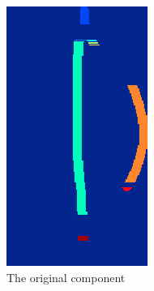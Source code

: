 \begin{figure}[H]
\begin{subfigure}[b]{.2\linewidth}
      \centering
      \includegraphics[width=\linewidth]{gfx/techniques/stem-detection-2.png}
      \caption{The original component}
      \label{fig:stem-segmentation-2}
  \end{subfigure}
  \begin{subfigure}[b]{.2\linewidth}
      \centering

\end{subfigure}
\end{figure}
